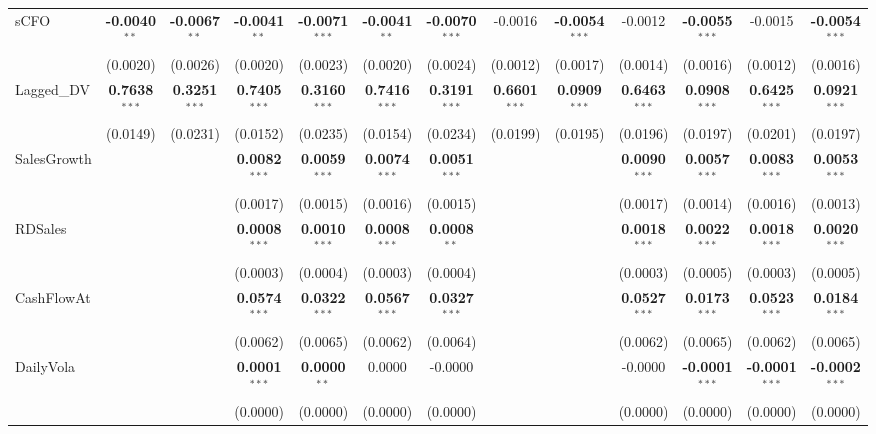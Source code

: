 \begin{landscape}
\begin{table}[H]
\begin{tabular}{lcccccccccccc}
sCFO & \textbf{-0.0040}$^{**}$ & \textbf{-0.0067}$^{**}$ & \textbf{-0.0041}$^{**}$ & \textbf{-0.0071}$^{***}$ & \textbf{-0.0041}$^{**}$ & \textbf{-0.0070}$^{***}$ & -0.0016 & \textbf{-0.0054}$^{***}$ & -0.0012 & \textbf{-0.0055}$^{***}$ & -0.0015 & \textbf{-0.0054}$^{***}$ \\
 & (0.0020) & (0.0026) & (0.0020) & (0.0023) & (0.0020) & (0.0024) & (0.0012) & (0.0017) & (0.0014) & (0.0016) & (0.0012) & (0.0016) \\
Lagged\_DV & \textbf{0.7638}$^{***}$ & \textbf{0.3251}$^{***}$ & \textbf{0.7405}$^{***}$ & \textbf{0.3160}$^{***}$ & \textbf{0.7416}$^{***}$ & \textbf{0.3191}$^{***}$ & \textbf{0.6601}$^{***}$ & \textbf{0.0909}$^{***}$ & \textbf{0.6463}$^{***}$ & \textbf{0.0908}$^{***}$ & \textbf{0.6425}$^{***}$ & \textbf{0.0921}$^{***}$ \\
 & (0.0149) & (0.0231) & (0.0152) & (0.0235) & (0.0154) & (0.0234) & (0.0199) & (0.0195) & (0.0196) & (0.0197) & (0.0201) & (0.0197) \\
SalesGrowth &  &  & \textbf{0.0082}$^{***}$ & \textbf{0.0059}$^{***}$ & \textbf{0.0074}$^{***}$ & \textbf{0.0051}$^{***}$ &  &  & \textbf{0.0090}$^{***}$ & \textbf{0.0057}$^{***}$ & \textbf{0.0083}$^{***}$ & \textbf{0.0053}$^{***}$ \\
 &  &  & (0.0017) & (0.0015) & (0.0016) & (0.0015) &  &  & (0.0017) & (0.0014) & (0.0016) & (0.0013) \\
RDSales &  &  & \textbf{0.0008}$^{***}$ & \textbf{0.0010}$^{***}$ & \textbf{0.0008}$^{***}$ & \textbf{0.0008}$^{**}$ &  &  & \textbf{0.0018}$^{***}$ & \textbf{0.0022}$^{***}$ & \textbf{0.0018}$^{***}$ & \textbf{0.0020}$^{***}$ \\
 &  &  & (0.0003) & (0.0004) & (0.0003) & (0.0004) &  &  & (0.0003) & (0.0005) & (0.0003) & (0.0005) \\
CashFlowAt &  &  & \textbf{0.0574}$^{***}$ & \textbf{0.0322}$^{***}$ & \textbf{0.0567}$^{***}$ & \textbf{0.0327}$^{***}$ &  &  & \textbf{0.0527}$^{***}$ & \textbf{0.0173}$^{***}$ & \textbf{0.0523}$^{***}$ & \textbf{0.0184}$^{***}$ \\
 &  &  & (0.0062) & (0.0065) & (0.0062) & (0.0064) &  &  & (0.0062) & (0.0065) & (0.0062) & (0.0065) \\
DailyVola &  &  & \textbf{0.0001}$^{***}$ & \textbf{0.0000}$^{**}$ & 0.0000 & -0.0000 &  &  & -0.0000 & \textbf{-0.0001}$^{***}$ & \textbf{-0.0001}$^{***}$ & \textbf{-0.0002}$^{***}$ \\
 &  &  & (0.0000) & (0.0000) & (0.0000) & (0.0000) &  &  & (0.0000) & (0.0000) & (0.0000) & (0.0000) \\

\end{tabular}
\end{table}
\end{landscape}
